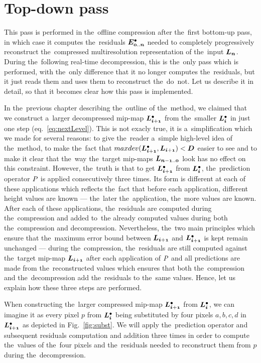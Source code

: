 \section{Top-down pass}\label{sec:top-down}
This pass is performed in the~offline compression after the~first bottom-up pass, in which case it computes the~residuals $\objdot{E}{0..n}$ needed to completely progressively reconstruct the~compressed multiresolution representation of the~input $\lnorm{n}$. During the~following real-time decompression, this is the~only pass which is performed, with the~only difference that it no longer computes the~residuals, but it just reads them and uses them to reconstruct the~do~not. Let us describe it in detail, so that it becomes clear how this pass is implemented.

In the~previous chapter describing the~outline of the~method, we claimed that we construct a~larger decompressed mip-map $\ldot{i+1}$ from the~smaller $\ldot{i}$ in just one step (eq.~\ref{eq:nextLevel}). This is not exacly true, it is a~simplification which we made for several reasons: to give the~reader a~simple high-level idea of the~method, to make the~fact that $maxdev(\ldot{i+1}, \lnorm{i+1}) < \objnorm{D}{}$ easier to see and to make it clear that the~way the~target mip-maps $\lnorm{n-1..0}$ look has no effect on this constraint. However, the~truth is that to get $\ldot{i+1}$ from $\ldot{i}$, the~prediction operator $\mathit{P_{}}$ is applied consecutively three times. Its form is different at each of these applications which reflects the~fact that before each application, different height values are known --- the~later the~application, the~more values are known. After each of these applications, the~residuals are computed during the~compression and added to~the already computed values during both the~compression and decompression. Nevertheless, the~two main principles which ensure that the~maximum error bound between $\lnorm{i+1}$ and $\ldot{i+1}$ is kept remain unchanged --- during the~compression, the~residuals are still computed against the~target mip-map $\lnorm{i+1}$ after each application of $\mathit{P_{}}$ and all predictions are made from the~reconstructed values which ensures that both the~compression and the~decompression add the~residuals to the~same values. Hence, let us explain how these three steps are performed.

 When constructing the~larger compressed mip-map $\ldot{i+1}$ from $\ldot{i}$, we can imagine it as every pixel $p$ from $\ldot{i}$ being substituted by four pixels $a, b, c, d$ in $\ldot{i+1}$ as depicted in Fig.~\ref{fig:subst}. We will apply the~prediction operator and subsequent residuals computation and addition three times in order to compute the~values of the~four pixels and the~residuals needed to reconstruct them from $p$ during the~decompression.

